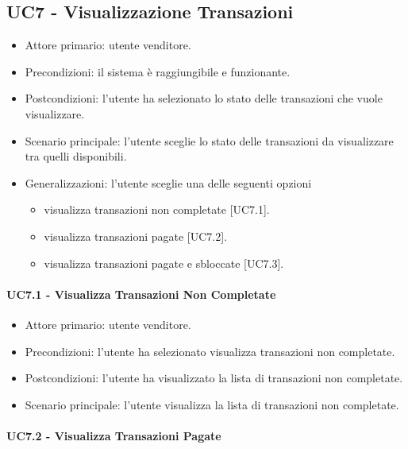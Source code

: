 \subsection{UC7 - Visualizzazione Transazioni}

\begin{itemize}
    \item Attore primario: utente venditore.
    \item Precondizioni: il sistema è raggiungibile e funzionante.
    \item Postcondizioni: l'utente ha selezionato lo stato delle transazioni che vuole visualizzare.
    \item Scenario principale: l'utente sceglie lo stato delle transazioni da visualizzare tra quelli disponibili.
    \item Generalizzazioni: l'utente sceglie una delle seguenti opzioni\begin{itemize}
        \item visualizza transazioni non completate [UC7.1].
        \item visualizza transazioni pagate [UC7.2].
        \item visualizza transazioni pagate e sbloccate [UC7.3].
    \end{itemize}
\end{itemize}

\paragraph{UC7.1 - Visualizza Transazioni Non Completate}

\begin{itemize}
    \item Attore primario: utente venditore.
    \item Precondizioni: l'utente ha selezionato visualizza transazioni non completate.
    \item Postcondizioni: l'utente ha visualizzato la lista di transazioni non completate.
    \item Scenario principale: l'utente visualizza la lista di transazioni non completate.
\end{itemize}

\paragraph{UC7.2 - Visualizza Transazioni Pagate}

